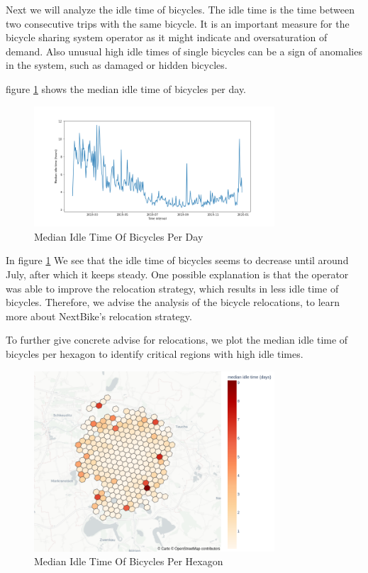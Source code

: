 Next we will analyze the idle time of bicycles. The idle time is the time
between two consecutive trips with the same bicycle. It is an important measure
for the bicycle sharing system operator as it might indicate and oversaturation
of demand. Also unusual high idle times of single bicycles can be a sign of
anomalies in the system, such as damaged or hidden bicycles.


figure \ref{fig:descriptive_analysis_idle_time_daily} shows the median idle time of bicycles per day.
\begin{figure}[htb]
    \centering
    \includegraphics[width=0.8\textwidth]{figures/descriptive_analysis/idle_time_daily.png}
    \caption{Median Idle Time Of Bicycles Per Day}
    \label{fig:descriptive_analysis_idle_time_daily}
\end{figure}

In figure \ref{fig:descriptive_analysis_idle_time_daily} We see that the idle time of bicycles seems to decrease until around July, after which it keeps steady.
One possible explanation is that the operator was able to improve the relocation
strategy, which results in less idle time of bicycles.
Therefore, we advise the analysis of the bicycle relocations, to learn more about
NextBike's relocation strategy.

To further give concrete advise for relocations, we plot the median idle time
of bicycles per hexagon to identify critical regions with high idle times.

\begin{figure}[htb]
    \centering
    \includegraphics[width=0.8\textwidth]{figures/descriptive_analysis/ide_time_hexagon.png}
    \caption{Median Idle Time Of Bicycles Per Hexagon}
    \label{fig:descriptive_analysis_idle_time_hexagon}
\end{figure}

